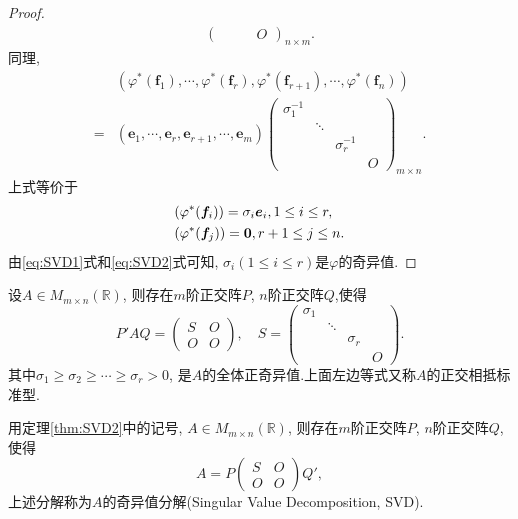 \begin{proof}
\begin{align*}
\begin{pmatrix}
        &&&O
        \end{pmatrix}_{n\times m}.
      \end{align*}
      同理,
      \begin{align*}
      & (\varphi^*(\bm{f}_1),\cdots,\varphi^*(\bm{f}_r),\varphi^*(\bm{f}_{r+1}),
      \cdots,\varphi^*(\bm{f}_n))\\
      = &(\bm{e}_1,\cdots,\bm{e}_r,\bm{e}_{r+1},\cdots,\bm{e}_m)
      \begin{pmatrix}
        \sigma_1^{-1}&&&\\
        &\ddots&&\\
        &&\sigma_r^{-1}&\\
        &&&O
        \end{pmatrix}_{m\times n}.
      \end{align*}
      上式等价于
      \begin{align}
        & (\varphi^*(\bm{f}_i))=\sigma_i\bm{e}_i, 1\leq i\leq r,\label{eq:SVD2}\\
        & (\varphi^*(\bm{f}_j))=\bm{0}, r+1\leq j\leq n.\notag
      \end{align}
      由\eqref{eq:SVD1}式和\eqref{eq:SVD2}式可知,
      $\sigma_i(1\leq i \leq r)$是$\varphi$的奇异值.
    \end{proof}

    \begin{theorem}\label{thm:SVD2}
      设$A\in M_{m\times n}(\mathbb{R})$, 则存在$m$阶正交阵$P$, 
      $n$阶正交阵$Q$,使得
      \[
        P'AQ= \begin{pmatrix}
          S&O\\
          O&O
          \end{pmatrix}, \quad
          S=\begin{pmatrix}
            \sigma_1&&&\\
            &\ddots&&\\
            &&\sigma_r&\\
            &&&O
            \end{pmatrix}.
      \]
      其中$\sigma_1\geq\sigma_2\geq\cdots\geq\sigma_r>0$,
      是$A$的全体正奇异值.上面左边等式又称$A$的正交相抵标准型.
    \end{theorem}

    \begin{definition}
      用定理\ref{thm:SVD2}中的记号, $A\in M_{m\times n}(\mathbb{R})$,
      则存在$m$阶正交阵$P$, $n$阶正交阵$Q$,使得
      \[
        A = P\begin{pmatrix}
          S&O\\
          O&O
          \end{pmatrix}Q',
      \]
      上述分解称为$A$的奇异值分解(Singular Value Decomposition, SVD).
    \end{definition}

